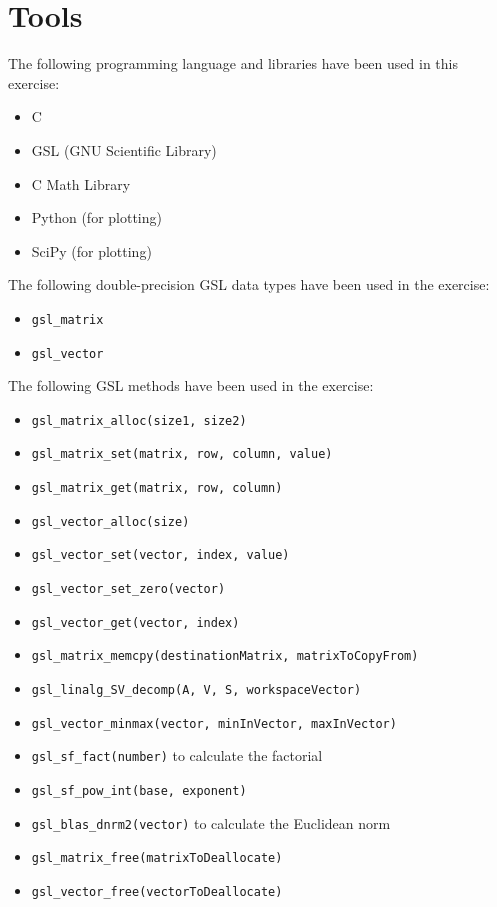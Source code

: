 \documentclass{article}
\newcommand{\code}{\texttt}
\begin{document}


\section{Tools}
The following programming language and libraries have been used in this exercise:
\begin{itemize}
  \item C
  \item GSL (GNU Scientific Library)
  \item C Math Library
  \item Python (for plotting)
  \item SciPy (for plotting)
\end{itemize}
The following double-precision GSL data types have been used in the exercise:
\begin{itemize}
  \item \code{gsl\_matrix}
  \item \code{gsl\_vector}
\end{itemize}
The following GSL methods have been used in the exercise:
\begin{itemize}
  \item \code{gsl\_matrix\_alloc(size1, size2)}
  \item \code{gsl\_matrix\_set(matrix, row, column, value)}
  \item \code{gsl\_matrix\_get(matrix, row, column)}
  \item \code{gsl\_vector\_alloc(size)}
  \item \code{gsl\_vector\_set(vector, index, value)}
  \item \code{gsl\_vector\_set\_zero(vector)}
  \item \code{gsl\_vector\_get(vector, index)}
  \item \code{gsl\_matrix\_memcpy(destinationMatrix, matrixToCopyFrom)}
  \item \code{gsl\_linalg\_SV\_decomp(A, V, S, workspaceVector)}
  \item \code{gsl\_vector\_minmax(vector, minInVector, maxInVector)}
  \item \code{gsl\_sf\_fact(number)} to calculate the factorial
  \item \code{gsl\_sf\_pow\_int(base, exponent)}
  \item \code{gsl\_blas\_dnrm2(vector)} to calculate the Euclidean norm
  \item \code{gsl\_matrix\_free(matrixToDeallocate)}
  \item \code{gsl\_vector\_free(vectorToDeallocate)}
\end{itemize}
\end{document}

